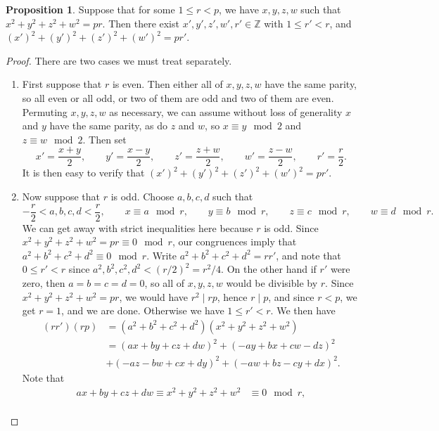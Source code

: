 \documentclass{article}
\newcommand{\Z}{\mathbb{Z}}
\newcommand{\rb}[1]{\left( #1 \right)}
\theoremstyle{definition}\newtheorem{definition}{Definition}
\theoremstyle{definition}\newtheorem{remark}[definition]{Remark}
\theoremstyle{definition}\newtheorem*{example}{Example}
\theoremstyle{definition}\newtheorem*{note}{Note}
\newtheorem{proposition}[definition]{Proposition}
\begin{document}
\begin{proposition}
\label{prop:55}
Suppose that for some $ 1 \le r < p $, we have $ x, y, z, w $ such that $ x^2 + y^2 + z^2 + w^2 = pr $. Then there exist $ x', y', z', w', r' \in \Z $ with $ 1 \le r' < r $, and $ \rb{x'}^2 + \rb{y'}^2 + \rb{z'}^2 + \rb{w'}^2 = pr' $.
\end{proposition}

\begin{proof}
There are two cases we must treat separately.
\begin{enumerate}
\item First suppose that $ r $ is even. Then either all of $ x, y, z, w $ have the same parity, so all even or all odd, or two of them are odd and two of them are even. Permuting $ x, y, z, w $ as necessary, we can assume without loss of generality $ x $ and $ y $ have the same parity, as do $ z $ and $ w $, so $ x \equiv y \mod 2 $ and $ z \equiv w \mod 2 $. Then set
$$ x' = \dfrac{x + y}{2}, \qquad y' = \dfrac{x - y}{2}, \qquad z' = \dfrac{z + w}{2}, \qquad w' = \dfrac{z - w}{2}, \qquad r' = \dfrac{r}{2}. $$
It is then easy to verify that $ \rb{x'}^2 + \rb{y'}^2 + \rb{z'}^2 + \rb{w'}^2 = pr' $.
\item Now suppose that $ r $ is odd. Choose $ a, b, c, d $ such that
$$ -\dfrac{r}{2} < a, b, c, d < \dfrac{r}{2}, \qquad x \equiv a \mod r, \qquad y \equiv b \mod r, \qquad z \equiv c \mod r, \qquad w \equiv d \mod r. $$
We can get away with strict inequalities here because $ r $ is odd. Since $ x^2 + y^2 + z^2 + w^2 = pr \equiv 0 \mod r $, our congruences imply that $ a^2 + b^2 + c^2 + d^2 \equiv 0 \mod r $. Write $ a^2 + b^2 + c^2 + d^2 = rr' $, and note that $ 0 \le r' < r $ since $ a^2, b^2, c^2, d^2 < \rb{r / 2}^2 = r^2 / 4 $. On the other hand if $ r' $ were zero, then $ a = b = c = d = 0 $, so all of $ x, y, z, w $ would be divisible by $ r $. Since $ x^2 + y^2 + z^2 + w^2 = pr $, we would have $ r^2 \mid rp $, hence $ r \mid p $, and since $ r < p $, we get $ r = 1 $, and we are done. Otherwise we have $ 1 \le r' < r $. We then have
\begin{align*}
\rb{rr'}\rb{rp}
& = \rb{a^2 + b^2 + c^2 + d^2}\rb{x^2 + y^2 + z^2 + w^2} \\
& = \rb{ax + by + cz + dw}^2 + \rb{-ay + bx + cw - dz}^2 \\
& + \rb{-az - bw + cx + dy}^2 + \rb{-aw + bz - cy + dx}^2.
\end{align*}
Note that
\begin{align*}
ax + by + cz + dw \equiv x^2 + y^2 + z^2 + w^2 & \equiv 0 \mod r, \\

\end{align*}
\end{enumerate}
\end{proof}
\end{document}
